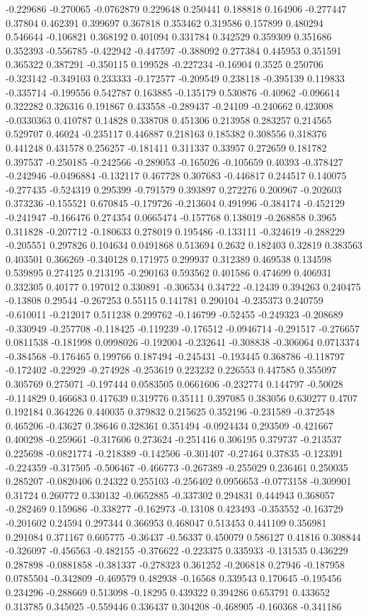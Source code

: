 -0.229686 -0.270065 -0.0762879 0.229648 0.250441 0.188818 0.164906 -0.277447 0.37804 0.462391 0.399697 0.367818 0.353462 0.319586 0.157899 0.480294 0.546644 -0.106821 0.368192 0.401094 0.331784 0.342529 0.359309 0.351686 0.352393 -0.556785 -0.422942 -0.447597 -0.388092 0.277384 0.445953 0.351591 0.365322 0.387291 -0.350115 0.199528 -0.227234 -0.16904 0.3525 0.250706 -0.323142 -0.349103 0.233333 -0.172577 -0.209549 0.238118 -0.395139 0.119833 -0.335714 -0.199556 0.542787 0.163885 -0.135179 0.530876 -0.40962 -0.096614 0.322282 0.326316 0.191867 0.433558 -0.289437 -0.24109 -0.240662 0.423008 -0.0330363 0.410787 0.14828 0.338708 0.451306 0.213958 0.283257 0.214565 0.529707 0.46024 -0.235117 0.446887 0.218163 0.185382 0.308556 0.318376 0.441248 0.431578 0.256257 -0.181411 0.311337 0.33957 0.272659 0.181782 0.397537 -0.250185 -0.242566 -0.289053 -0.165026 -0.105659 0.40393 -0.378427 -0.242946 -0.0496884 -0.132117 0.467728 0.307683 -0.446817 0.244517 0.140075 -0.277435 -0.524319 0.295399 -0.791579 0.393897 0.272276 0.200967 -0.202603 0.373236 -0.155521 0.670845 -0.179726 -0.213604 0.491996 -0.384174 -0.452129 -0.241947 -0.166476 0.274354 0.0665474 -0.157768 0.138019 -0.268858 0.3965 0.311828 -0.207712 -0.180633 0.278019 0.195486 -0.133111 -0.324619 -0.288229 -0.205551 0.297826 0.104634 0.0491868 0.513694 0.2632 0.182403 0.32819 0.383563 0.403501 0.366269 -0.340128 0.171975 0.299937 0.312389 0.469538 0.134598 0.539895 0.274125 0.213195 -0.290163 0.593562 0.401586 0.474699 0.406931 0.332305 0.40177 0.197012 0.330891 -0.306534 0.34722 -0.12439 0.394263 0.240475 -0.13808 0.29544 -0.267253 0.55115 0.141781 0.290104 -0.235373 0.240759 -0.610011 -0.212017 0.511238 0.299762 -0.146799 -0.52455 -0.249323 -0.208689 -0.330949 -0.257708 -0.118425 -0.119239 -0.176512 -0.0946714 -0.291517 -0.276657 0.0811538 -0.181998 0.0998026 -0.192004 -0.232641 -0.308838 -0.306064 0.0713374 -0.384568 -0.176465 0.199766 0.187494 -0.245431 -0.193445 0.368786 -0.118797 -0.172402 -0.22929 -0.274928 -0.253619 0.223232 0.226553 0.447585 0.355097 0.305769 0.275071 -0.197444 0.0583505 0.0661606 -0.232774 0.144797 -0.50028 -0.114829 0.466683 0.417639 0.319776 0.35111 0.397085 0.383056 0.630277 0.4707 0.192184 0.364226 0.440035 0.379832 0.215625 0.352196 -0.231589 -0.372548 0.465206 -0.43627 0.38646 0.328361 0.351494 -0.0924434 0.293509 -0.421667 0.400298 -0.259661 -0.317606 0.273624 -0.251416 0.306195 0.379737 -0.213537 0.225698 -0.0821774 -0.218389 -0.142506 -0.301407 -0.27464 0.37835 -0.123391 -0.224359 -0.317505 -0.506467 -0.466773 -0.267389 -0.255029 0.236461 0.250035 0.285207 -0.0820406 0.24322 0.255103 -0.256402 0.0956653 -0.0773158 -0.309901 0.31724 0.260772 0.330132 -0.0652885 -0.337302 0.294831 0.444943 0.368057 -0.282469 0.159686 -0.338277 -0.162973 -0.13108 0.423493 -0.353552 -0.163729 -0.201602 0.24594 0.297344 0.366953 0.468047 0.513453 0.441109 0.356981 0.291084 0.371167 0.605775 -0.36437 -0.56337 0.450079 0.586127 0.41816 0.308844 -0.326097 -0.456563 -0.482155 -0.376622 -0.223375 0.335933 -0.131535 0.436229 0.287898 -0.0881858 -0.381337 -0.278323 0.361252 -0.206818 0.27946 -0.187958 0.0785504 -0.342809 -0.469579 0.482938 -0.16568 0.339543 0.170645 -0.195456 0.234296 -0.288669 0.513098 -0.18295 0.439322 0.394286 0.653791 0.433652 0.313785 0.345025 -0.559446 0.336437 0.304208 -0.468905 -0.160368 -0.341186 